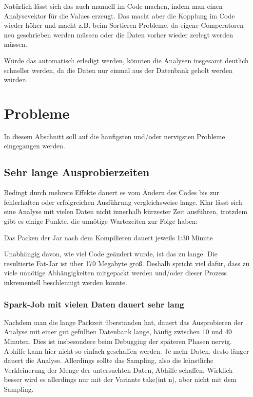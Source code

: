 Natürlich lässt sich das auch manuell im Code machen, indem man einen
Analysevektor für die Values erzeugt. Das macht aber die Kopplung im
Code wieder höher und macht z.B. beim Sortieren Probleme, da eigene
Comperatoren neu geschrieben werden müssen oder die Daten vorher wieder
zerlegt werden müssen.

Würde das automatisch erledigt werden, könnten die Analysen insgesamt
deutlich schneller werden, da die Daten nur einmal aus der Datenbank
geholt werden würden.

\section{Probleme}
In diesem Abschnitt soll auf die häufigsten und/oder nervigsten Probleme
eingegangen werden.

\subsection{Sehr lange Ausprobierzeiten}
Bedingt durch mehrere Effekte dauert es vom Ändern des Codes bis zur
fehlerhaften oder erfolgreichen Ausführung vergleichsweise lange. Klar
lässt sich eine Analyse mit vielen Daten nicht innerhalb kürzester Zeit
ausführen, trotzdem gibt es einige Punkte, die unnötige Wartezeiten zur
Folge haben:

Das Packen der Jar nach dem Kompilieren dauert jeweils 1:30 Minute

Unabhängig davon, wie viel Code geändert wurde, ist das zu lange. Die
resultierte Fat-Jar ist über 170 Megabyte groß. Deshalb spricht viel
dafür, dass zu viele unnötige Abhängigkeiten mitgepackt werden und/oder
dieser Prozess inkrementell beschleunigt werden könnte.

\subsubsection{Spark-Job mit vielen Daten dauert sehr
lang}
Nachdem man die lange Packzeit überstanden hat, dauert das Ausprobieren
der Analyse mit einer gut gefüllten Datenbank lange, häufig zwischen 10
und 40 Minuten. Dies ist insbesondere beim Debugging der späteren
Phasen nervig. Abhilfe kann hier nicht so einfach geschaffen werden. Je
mehr Daten, desto länger dauert die Analyse. Allerdings sollte das
Sampling, also die künstliche Verkleinerung der Menge der untersuchten
Daten, Abhilfe schaffen. Wirklich besser wird es allerdings nur mit der
Variante take(int n), aber nicht mit dem Sampling.

